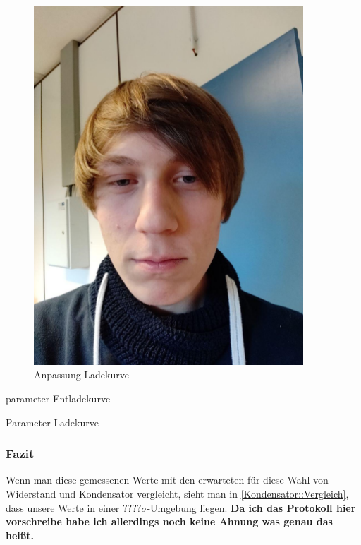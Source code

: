 \documentclass[12pt,twoside,a4paper]{scrartcl}
\begin{document}
\begin{figure}[H]
\begin{minipage}{0.4 \textwidth}
							\includegraphics[width = 0.9\textwidth]{Pictures/Platzhalter.jpg}
							\caption{Anpassung Ladekurve}
					\end{minipage}
				\end{figure}

				\begin{table}
					\centering
					\begin{minipage}{0.4 \textwidth}
						
						\caption{parameter Entladekurve}
					\end{minipage}
					\begin{minipage}{0.4 \textwidth}
						
						\caption{Parameter Ladekurve}
					\end{minipage}
				\end{table}

			\subsubsection{Fazit}
				Wenn man diese gemessenen Werte mit den erwarteten für diese Wahl von Widerstand und Kondensator vergleicht, sieht man in \ref{Kondensator::Vergleich}, dass unsere Werte in einer $???? \sigma$-Umgebung liegen. \textbf{Da ich das Protokoll hier vorschreibe habe ich allerdings noch keine Ahnung was genau das heißt.}
\end{document}
